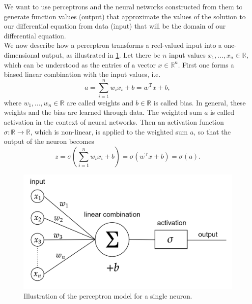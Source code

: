 We want to use perceptrons and the neural networks constructed from them to generate function values (output) that approximate the values of the solution to our differential equation from data (input) that will be the domain of our differential equation. \\
We now describe how a perceptron transforms a reel-valued input into a one-dimensional output, as illustrated in \cref{fig4}. Let there be $n$ input values $x_1, \ldots, x_n \in \mathbb{R}$, which can be understood as the entries of a vector $x \in \mathbb{R}^n$. First one forms a biased linear combination with the input values, i.e. 
\begin{equation*}
    a = \sum^{n}_{i=1} w_i x_i + b = w^{\mathrm{T}} x + b,
\end{equation*}
where $w_1, \ldots, w_n \in \mathbb{R}$ are called weights and $b \in \mathbb{R}$ is called bias. In general, these weights and the bias are learned through data. The weighted sum $a$ is called activation in the context of neural networks. Then an activation function $\sigma \colon \mathbb{R} \to \mathbb{R}$, which is non-linear, is applied to the weighted sum $a$, so that the output of the neuron becomes
\begin{equation*}
    z = \sigma(\sum^{n}_{i=1} w_i x_i + b) = \sigma(w^{\mathrm{T}} x + b) = \sigma(a).
\end{equation*}

\begin{figure}[H]
    \begin{center}
        \includegraphics[scale=0.3]{img/diagram-20220205_1.png}
    \end{center}
    \caption{Illustration of the perceptron model for a single neuron.}
    \label{fig4}
\end{figure}


